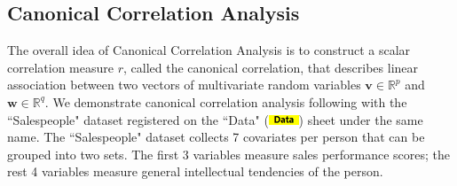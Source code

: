 \documentclass[article]{jss}
\numberwithin{equation}{subsection}
\newcommand{\shtData}{``Data" (\includegraphics[height=8pt, keepaspectratio=true]{img/DataSheetTab_png}) }
\begin{document}
        \subsection[egCCA]{Canonical Correlation Analysis}
        The overall idea of Canonical Correlation Analysis \citep{hotelling1936relations} is to construct a scalar correlation measure $r$, called the canonical correlation, that describes linear association between two vectors of multivariate random variables $\textbf{v}\in\mathbb{R}^p$ and $\textbf{w}\in\mathbb{R}^q$. We demonstrate canonical correlation analysis following \cite{anderson2003introMVA3e} with the ``Salespeople" dataset registered on the \shtData sheet under the same name. The ``Salespeople" dataset collects 7 covariates per person that can be grouped into two sets. The first 3 variables measure sales performance scores; the rest 4 variables measure general intellectual tendencies of the person.
        
\end{document}
